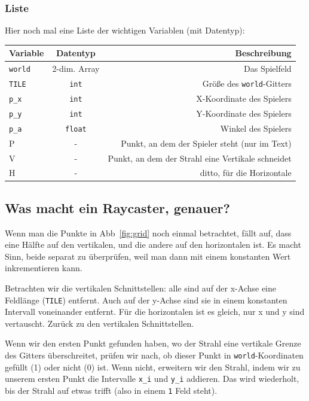 \documentclass[a4paper,12pt]{report}
\begin{document}
\subsubsection{Liste}
Hier noch mal eine Liste der wichtigen Variablen (mit Datentyp):
\begin{center}
	\begin{tabular}{|l|c|r|}
		\hline
		Variable & Datentyp & Beschreibung \\ \hline
		\hline
		\texttt{world} & 2-dim. Array & Das Spielfeld \\ \hline
		\texttt{TILE} & \texttt{int} & Größe des \texttt{world}-Gitters \\ \hline
		\texttt{p\_x} & \texttt{int} & X-Koordinate des Spielers \\ \hline
		\texttt{p\_y} & \texttt{int} & Y-Koordinate des Spielers \\ \hline
		\texttt{p\_a} & \texttt{float} & Winkel des Spielers \\ \hline
		P & - & Punkt, an dem der Spieler steht (nur im Text) \\ \hline
		V & - & Punkt, an dem der Strahl eine Vertikale schneidet \\ \hline
		H & - & ditto, für die Horizontale \\ \hline
	\end{tabular}
\end{center}


\subsection{Was macht ein Raycaster, genauer?}
Wenn man die Punkte in Abb~\ref{fig:grid} noch einmal betrachtet, fällt auf, dass eine Hälfte auf den vertikalen, und die andere auf den horizontalen ist. Es macht Sinn, beide separat zu überprüfen, weil man dann mit einem konstanten Wert inkrementieren kann.

Betrachten wir die vertikalen Schnittstellen: alle sind auf der x-Achse eine Feldlänge (\texttt{TILE}) entfernt. Auch auf der y-Achse sind sie in einem konstanten Intervall voneinander entfernt. Für die horizontalen ist es gleich, nur x und y sind vertauscht. Zurück zu den vertikalen Schnittstellen.

Wenn wir den ersten Punkt gefunden haben, wo der Strahl eine vertikale Grenze des Gitters überschreitet, prüfen wir nach, ob dieser Punkt in \texttt{world}-Koordinaten gefüllt (1) oder nicht (0) ist. Wenn nicht, erweitern wir den Strahl, indem wir zu unserem ersten Punkt die Intervalle \texttt{x\_i} und \texttt{y\_i} addieren. Das wird wiederholt, bis der Strahl auf etwas trifft (also in einem \texttt{1} Feld steht).
\end{document}
